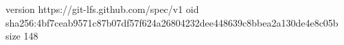version https://git-lfs.github.com/spec/v1
oid sha256:4bf7ceab9571c87b07df57f624a26804232dee448639c8bbea2a130de4e8c05b
size 148
